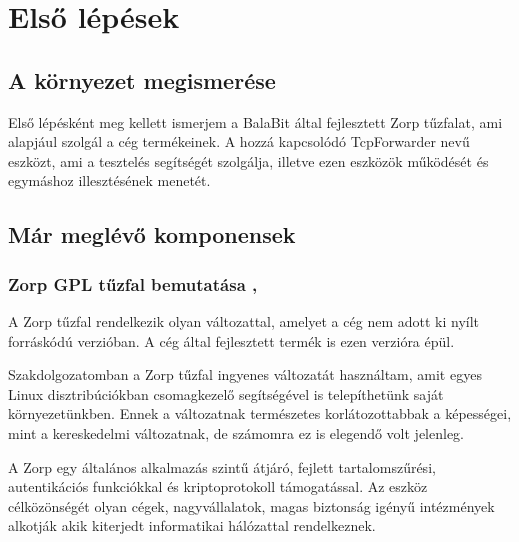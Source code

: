 \documentclass[a4paper,12pt,oneside]{report}
\begin{document}



\section{Első lépések}

\subsection{A környezet megismerése}

Első lépésként meg kellett ismerjem a BalaBit\cite{website:balabit} által fejlesztett Zorp tűzfalat, ami alapjául szolgál a cég termékeinek. A hozzá kapcsolódó TcpForwarder nevű eszközt, ami a tesztelés segítségét szolgálja, illetve ezen eszközök működését és egymáshoz illesztésének menetét.
\newpage
\subsection{Már meglévő komponensek}

\subsubsection{Zorp GPL tűzfal bemutatása \cite{website:zorp}, \cite{article:zorparticle}} 

A Zorp tűzfal rendelkezik olyan változattal, amelyet a cég nem adott ki nyílt forráskódú  verzióban.
A cég által fejlesztett termék is ezen verzióra épül.

Szakdolgozatomban a Zorp tűzfal ingyenes változatát használtam, amit egyes Linux disztribúciókban csomagkezelő segítségével is telepíthetünk saját környezetünkben.
Ennek a változatnak természetes korlátozottabbak a képességei, mint a kereskedelmi változatnak, de számomra ez is elegendő volt jelenleg.

A Zorp egy általános alkalmazás szintű átjáró, fejlett tartalomszűrési, autentikációs funkciókkal és kriptoprotokoll támogatással.
Az eszköz célközönségét olyan cégek, nagyvállalatok, magas biztonság igényű intézmények alkotják akik kiterjedt informatikai hálózattal rendelkeznek.
\end{document}
